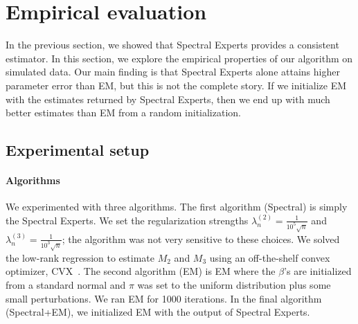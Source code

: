 \section{Empirical evaluation}
\label{sec:evaluation}

In the previous section, we showed that Spectral Experts provides a consistent
estimator.  %
In this section, we explore the empirical properties of our algorithm on simulated data.
Our main finding is that Spectral Experts alone attains higher parameter error than EM,
but this is not the complete story.
If we initialize EM with the estimates returned by Spectral Experts,
then we end up with much better estimates than EM from a random initialization.

\subsection{Experimental setup}

\paragraph{Algorithms}

We experimented with three algorithms.
The first algorithm (Spectral) is simply the Spectral Experts.
We set the regularization strengths $\lambda_n^{(2)} = \frac{1}{10^{5} \sqrt{n}}$
and $\lambda_n^{(3)} = \frac{1}{10^{3} \sqrt{n}}$;
the algorithm was not very sensitive to these choices.
We solved the low-rank regression to estimate $M_2$ and
$M_3$ using an off-the-shelf convex optimizer, CVX~\cite{cvx}.
The second algorithm (EM) is EM where the $\beta$'s are initialized from a standard normal
and $\pi$ was set to the uniform distribution plus some small perturbations.
We ran EM for 1000 iterations.
In the final algorithm (Spectral+EM),
we initialized EM with the output of Spectral Experts.

